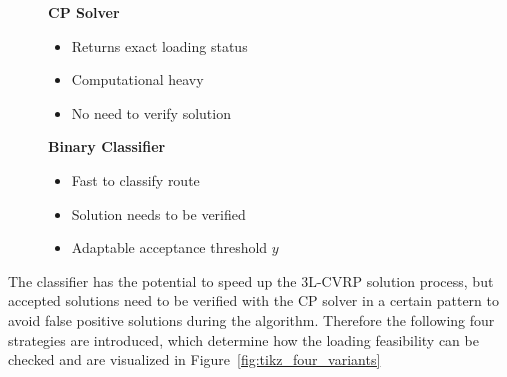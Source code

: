 \begin{figure}[ht]
    \centering
    \begin{minipage}[centering]{0.45\textwidth}
        \textbf{CP Solver}
        \begin{itemize}
            \item Returns exact loading status
            \item Computational heavy
            \item No need to verify solution
        \end{itemize}
    \end{minipage}
    \begin{minipage}[centering]{0.45\textwidth}
        \textbf{Binary Classifier}
        \begin{itemize}
            \item Fast to classify route
            \item Solution needs to be verified
            \item Adaptable acceptance threshold $y$
        \end{itemize}
    \end{minipage}
\end{figure}

The classifier has the potential to speed up the \gls{3L-CVRP} solution process, but accepted solutions need to be
verified with the \gls{CP} solver in a certain pattern to avoid false positive solutions during the algorithm.
Therefore the following four strategies are introduced, which determine how the loading feasibility can be checked and are
visualized in Figure~\ref{fig:tikz_four_variants}



